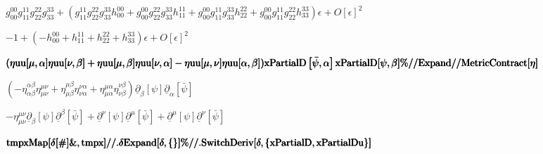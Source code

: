 \documentclass{article}
\begin{document}
\begin{doublespace}
\noindent\(g_{00}^{00} g_{11}^{11} g_{22}^{22} g_{33}^{33}+\left(g_{11}^{11} g_{22}^{22} g_{33}^{33} h_{00}^{00}+g_{00}^{00} g_{22}^{22} g_{33}^{33} h_{11}^{11}+g_{00}^{00} g_{11}^{11} g_{33}^{33} h_{22}^{22}+g_{00}^{00} g_{11}^{11} g_{22}^{22} h_{33}^{33}\right) \epsilon +O[\epsilon ]^2\)
\end{doublespace}

\begin{doublespace}
\noindent\(-1+\left(-h_{00}^{00}+h_{11}^{11}+h_{22}^{22}+h_{33}^{33}\right) \epsilon +O[\epsilon ]^2\)
\end{doublespace}

\begin{doublespace}
\noindent\(\pmb{(\text{$\eta $uu}[\mu ,\alpha ]\text{$\eta $uu}[\nu ,\beta ]+\text{$\eta $uu}[\mu ,\beta ]\text{$\eta $uu}[\nu ,\alpha ]-\text{$\eta $uu}[\mu ,\nu ]\text{$\eta $uu}[\alpha ,\beta ])\text{xPartialD}\left[\bar{\psi },\alpha \right]\text{xPartialD}[\psi ,\beta ]}\\
\pmb{\%\text{//}\text{Expand}\text{//}\text{MetricContract}[\eta ]}\)
\end{doublespace}

\begin{doublespace}
\noindent\(\left(-\eta _{\alpha \beta }^{\alpha \beta } \eta _{\mu \nu }^{\mu \nu }+\eta _{\mu \beta }^{\mu \beta } \eta _{\nu \alpha }^{\nu \alpha }+\eta _{\mu \alpha }^{\mu \alpha } \eta _{\nu \beta }^{\nu \beta }\right) \underline{\partial }_{\beta }[\psi ] \underline{\partial }_{\alpha }\left[\bar{\psi }\right]\)
\end{doublespace}

\begin{doublespace}
\noindent\(-\eta _{\mu \nu }^{\mu \nu } \underline{\partial }_{\beta }[\psi ] \underline{\partial }^{\beta }\left[\bar{\psi }\right]+\underline{\partial }^{\nu }[\psi ] \underline{\partial }^{\mu }\left[\bar{\psi }\right]+\underline{\partial }^{\mu }[\psi ] \underline{\partial }^{\nu }\left[\bar{\psi }\right]\)
\end{doublespace}

\begin{doublespace}
\noindent\(\pmb{\text{tmpx}}\\
\pmb{\text{Map}[\delta [\#]\&,\text{tmpx}]\text{//.}\text{$\delta $Expand}[\delta ,\{\}]}\\
\pmb{\%\text{//.}\text{SwitchDeriv}[\delta ,\{\text{xPartialD},\text{xPartialDu}\}]}\)
\end{doublespace}
\end{document}
